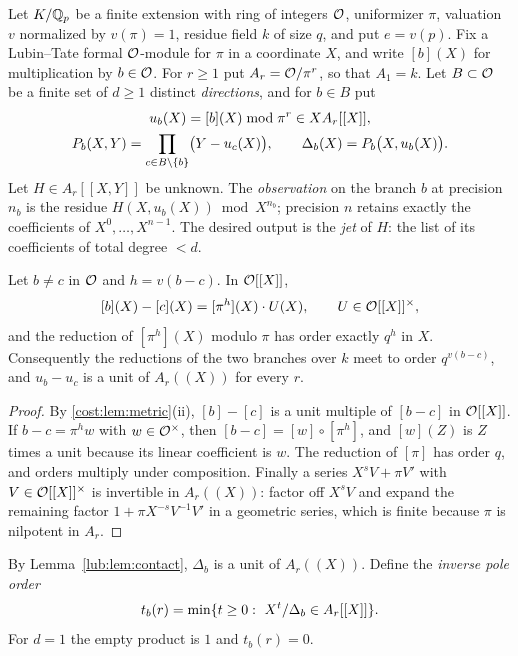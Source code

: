 Let $K/\mathbb{Q}_p$ be a finite extension with ring of integers $\mathcal{O}$, uniformizer $\pi$, valuation
$v$ normalized by $v(\pi)=1$, residue field $k$ of size $q$, and put $e=v(p)$. Fix a
Lubin--Tate formal $\mathcal{O}$-module for $\pi$ in a coordinate $X$, and write $[b](X)$ for
multiplication by $b\in\mathcal{O}$. For $r\ge1$ put $A_r=\mathcal{O}/\pi^r$, so that $A_1=k$. Let
$B\subset\mathcal{O}$ be a finite set of $d\ge1$ distinct \emph{directions}, and for $b\in B$ put
\begin{gather*}
 u_b(X)=[b](X)\bmod\pi^r\in XA_r[[X]],\\
 P_b(X,Y)=\prod_{c\in B\setminus\{b\}}\bigl(Y-u_c(X)\bigr),\qquad
 \Delta_b(X)=P_b\bigl(X,u_b(X)\bigr).
\end{gather*}
Let $H\in A_r[[X,Y]]$ be unknown. The \emph{observation} on the branch $b$ at precision
$n_b$ is the residue $H(X,u_b(X))\bmod X^{n_b}$; precision $n$ retains exactly the
coefficients of $X^0,\dots,X^{n-1}$. The desired output is the \emph{jet} of $H$: the list of its
coefficients of total degree $<d$.

\begin{lemma}\label{lub:lem:contact}
Let $b\ne c$ in $\mathcal{O}$ and $h=v(b-c)$. In $\mathcal{O}[[X]]$,
\[
 [b](X)-[c](X)=[\pi^h](X)\cdot U(X),\qquad U\in\mathcal{O}[[X]]^\times ,
\]
and the reduction of $[\pi^h](X)$ modulo $\pi$ has order exactly $q^h$ in $X$. Consequently
the reductions of the two branches over $k$ meet to order $q^{v(b-c)}$, and $u_b-u_c$ is a
unit of $A_r((X))$ for every $r$.
\end{lemma}
\begin{proof}
By \cref{cost:lem:metric}(ii), $[b]-[c]$ is a unit multiple of $[b-c]$ in $\mathcal{O}[[X]]$. If
$b-c=\pi^hw$ with $w\in\mathcal{O}^\times$, then
$[b-c]=[w]\circ[\pi^h]$, and $[w](Z)$ is $Z$ times a unit because its linear coefficient is
$w$. The reduction of $[\pi]$ has order $q$, and orders multiply under composition.
Finally a series $X^sV+\pi V'$ with $V\in\mathcal{O}[[X]]^\times$ is invertible in $A_r((X))$:
factor off $X^sV$ and expand the remaining factor $1+\pi X^{-s}V^{-1}V'$ in a geometric
series, which is finite because $\pi$ is nilpotent in $A_r$.
\end{proof}

By Lemma~\ref{lub:lem:contact}, $\Delta_b$ is a unit of $A_r((X))$. Define the \emph{inverse pole
order}
\begin{equation}\label{lub:eq:pole}
 t_b(r)=\min\{t\ge0:\ X^t/\Delta_b\in A_r[[X]]\}.
\end{equation}
For $d=1$ the empty product is $1$ and $t_b(r)=0$.

